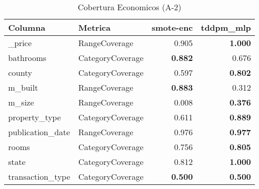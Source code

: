 \begin{table}[H]
\centering
\caption{Cobertura Economicos (A-2)}
\label{table-coverage-economicos-a-2}
\begin{tabular}{|l|l|r|r|}
\hline
\rowcolor[gray]{0.8}
Columna & Metrica & smote-enc & tddpm\_mlp \\
\hline \_price & RangeCoverage & 0.905 & \bfseries 1.000 \\
\hline bathrooms & CategoryCoverage & \bfseries 0.882 & 0.676 \\
\hline county & CategoryCoverage & 0.597 & \bfseries 0.802 \\
\hline m\_built & RangeCoverage & \bfseries 0.883 & 0.312 \\
\hline m\_size & RangeCoverage & 0.008 & \bfseries 0.376 \\
\hline property\_type & CategoryCoverage & 0.611 & \bfseries 0.889 \\
\hline publication\_date & RangeCoverage & 0.976 & \bfseries 0.977 \\
\hline rooms & CategoryCoverage & 0.756 & \bfseries 0.805 \\
\hline state & CategoryCoverage & 0.812 & \bfseries 1.000 \\
\hline transaction\_type & CategoryCoverage & \bfseries 0.500 & \bfseries 0.500 \\
\hline
\end{tabular}
\end{table}
